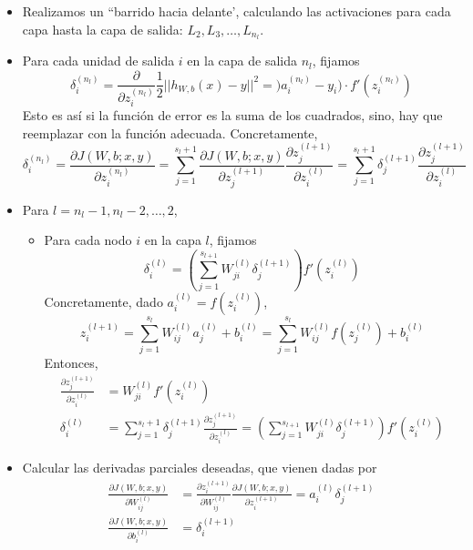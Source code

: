\begin{itemize}
\item Realizamos un ``barrido hacia delante', calculando las activaciones para cada capa hasta la capa de salida: $L_2, L_3, \dots, L_{n_l}$.
\item Para cada unidad de salida $i$ en la capa de salida $n_l$, fijamos
\begin{equation}
\delta^{(n_l)}_i = \frac{\partial}{\partial z^{(n_l)}_i} \frac{1}{2} ||h_{W,b}(x) - y||^2 = )a^{(n_l)}_i - y_i) \cdot f'(z^{(n_l)}_i)
\end{equation}
Esto es así si la función de error es la suma de los cuadrados, sino, hay que reemplazar con la función adecuada. Concretamente, 
\begin{equation}
\delta^{(n_l)}_i = \frac{\partial J(W, b; x, y)}{\partial z^{(n_l)}_i} = \sum_{j = 1}^{s_l + 1} \frac{\partial J(W, b; x, y)}{\partial z_j^{(l+1)}} \frac{\partial z_j^{(l+1)}}{\partial z_i^{(l)}} = \sum_{j = 1}^{s_l + 1} \delta^{(l + 1)}_j \frac{\partial z_j^{(l+1)}}{\partial z_i^{(l)}}
\end{equation}
\item Para $l = n_l - 1, n_l - 2, \dots, 2$,
\begin{itemize}
\item Para cada nodo $i$ en la capa $l$, fijamos
\begin{equation}
\delta^{(l)}_i = \left(\sum_{j = 1}^{s_{l+1}} W_{ji}^{(l)} \delta^{(l+1)}_j\right) f'(z^{(l)}_i)
\end{equation}
Concretamente, dado $a_i^{(l)} = f(z_i^{(l)})$,
\begin{equation}
z_i^{(l+1)} = \sum_{j = 1}^{s_l} W_{ij}^{(l)} a_j^{(l)} + b_i^{(l)} = \sum_{j = 1}^{s_l} W_{ij}^{(l)} f(z_j^{(l)}) + b_i^{(l)}
\end{equation}
Entonces,
\begin{align}
\frac{\partial z_j^{(l+1)}}{\partial z_i^{(l)}} &= W_{ji}^{(l)} f'(z_i^{(l)}) \\
\delta_i^{(l)} &= \sum_{j = 1}^{s_l + 1} \delta_j^{(l+1)} \frac{\partial z_j^{(l+1)}}{\partial z_i^{(l)}} = \left(\sum_{j = 1}^{s_{l+1}} W_{ji}^{(l)} \delta_j^{(l+1)}\right) f'(z_i^{(l)})
\end{align}
\end{itemize}
\item Calcular las derivadas parciales deseadas, que vienen dadas por 
\begin{align}
\frac{\partial J(W,b;x,y)}{\partial W^{(l)}_{ij}} &= \frac{\partial z_i^{(l+1)}}{\partial W_{ij}^{(l)}}\frac{\partial J(W, b; x, y)}{\partial z_i^{(l + 1)}} = a^{(l)}_i \delta^{(l+1)}_j \\
\frac{\partial J(W,b;x,y)}{\partial b^{(l)}_i} &= \delta^{(l+1)}_i
\end{align}
\end{itemize}

